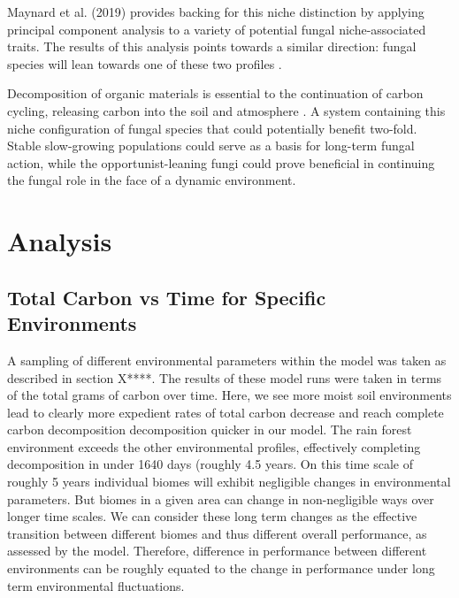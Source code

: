 \documentclass{article}
\begin{document}
Maynard et al. (2019) provides backing for this niche distinction by applying principal component analysis to a variety of potential fungal niche-associated traits. The results of this analysis points towards a similar direction: fungal species will lean towards one of these two profiles \cite{Maynard2019}.

Decomposition of organic materials is essential to the continuation of carbon cycling, releasing carbon into the soil and atmosphere \cite{Lustenhouwer2019}. A system containing this niche configuration of fungal species that could potentially benefit two-fold. Stable slow-growing populations could serve as a basis for long-term fungal action, while the opportunist-leaning fungi could prove beneficial in continuing the fungal role in the face of a dynamic environment.





\section{Analysis}



\subsection{Total Carbon vs Time for Specific Environments} %
 A sampling of different environmental parameters within the model was taken as described in section X****. The results of these model runs were taken in terms of the total grams of carbon over time. Here, we see more moist soil environments lead to clearly more expedient rates of total carbon decrease and reach complete carbon decomposition decomposition quicker in our model. The rain forest environment exceeds the other environmental profiles, effectively completing decomposition in under 1640 days (roughly 4.5 years. On this time scale of roughly 5 years individual biomes will exhibit negligible changes in environmental parameters. But biomes in a given area can change in non-negligible ways over longer time scales. We can consider these long term changes as the effective transition between different biomes and thus different overall performance, as assessed by the model. Therefore, difference in performance between different environments can be roughly equated to the change in performance under long term environmental fluctuations. 
 
\end{document}
